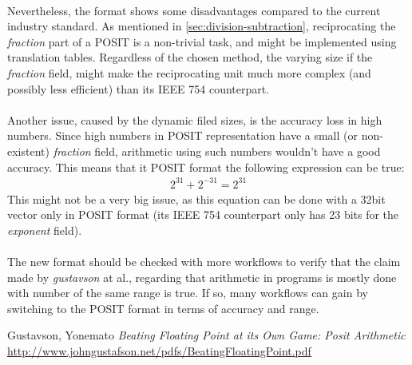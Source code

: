 \documentclass[10pt]{article}
\begin{document}
\paragraph{}
Nevertheless, the format shows some disadvantages compared to the current
industry standard. As mentioned in \autoref{sec:division-subtraction},
reciprocating the \textit{fraction} part of a POSIT is a non-trivial task, and
might be implemented using translation tables. Regardless of the chosen method,
the varying size if the \textit{fraction} field, might make the reciprocating
unit much more complex (and possibly less efficient) than its IEEE 754
counterpart.

\paragraph{}
Another issue, caused by the dynamic filed sizes, is the accuracy loss in high
numbers. Since high numbers in POSIT representation have a small (or
non-existent) \textit{fraction} field, arithmetic using such numbers wouldn't
have a good accuracy. This means that it POSIT format the following expression
can be true:
\begin{align*}
  2^{31} + 2^{-31} = 2^{31}
\end{align*}
This might not be a very big issue, as this equation can be done with a 32bit
vector only in POSIT format (its IEEE 754 counterpart only has 23 bits for the
\textit{exponent} field).

\paragraph{}
The new format should be checked with more workflows to verify that the claim
made by \textit{gustavson} at al.\cite{gustavson}, regarding that arithmetic in
programs is mostly done with number of the same range is true. If so, many
workflows can gain by switching to the POSIT format in terms of accuracy and range.

\begin{thebibliography}{99}
  Gustavson, Yonemato
  \textit{Beating Floating Point at its Own Game: Posit Arithmetic}
  \url{http://www.johngustafson.net/pdfs/BeatingFloatingPoint.pdf}

\end{thebibliography}
\end{document}
